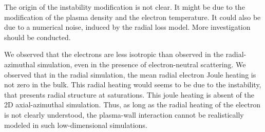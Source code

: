 The origin of the instability modification is not clear.
It might be due to the modification of the plasma density and the electron temperature.
It could also be due to a numerical noise, induced by the radial loss model.
More investigation should be conducted.

\vspace{1em}
We observed that the electrons are less isotropic than observed in the radial-azimuthal simulation, even in the presence of electron-neutral scattering.
We observed that in the radial simulation, the mean radial electron Joule heating is not zero in the bulk.
This radial heating would seems to be due to the instability, that presents radial structure at saturations.
This joule heating is absent of the \ac{2D} axial-azimuthal simulation.
Thus, as long as the radial heating of the electron is not clearly understood, the plasma-wall interaction cannot be realistically modeled in such low-dimensional simulations.

